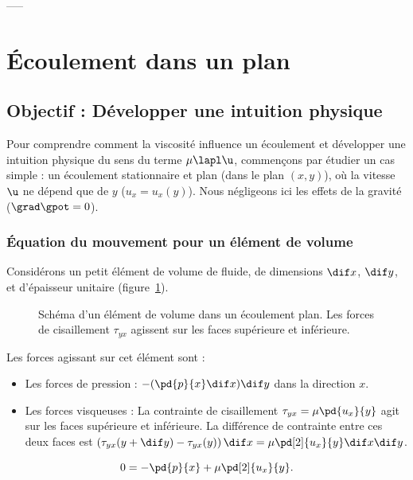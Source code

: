 -----

\section{Écoulement dans un plan}
\label{sec:ecoulement_plan}

\subsection{Objectif : Développer une intuition physique}
Pour comprendre comment la viscosité influence un écoulement et développer une intuition physique du sens du terme $\mu\lapl\u$, commençons par étudier un cas simple : un écoulement stationnaire et plan (dans le plan $(x,y)$), où la vitesse $\u$ ne dépend que de $y$ ($u_x = u_x(y)$). Nous négligeons ici les effets de la gravité ($\grad \gpot = 0$).

\subsubsection{Équation du mouvement pour un élément de volume}
Considérons un petit élément de volume de fluide, de dimensions $\dif x$, $\dif y$, et d'épaisseur unitaire (figure~\ref{fig:element_volume_plan}).

\begin{figure}[h]
\centering
\missingfigure{}
\caption{Schéma d'un élément de volume dans un écoulement plan. Les forces de cisaillement $\tau_{yx}$ agissent sur les faces supérieure et inférieure.}
\label{fig:element_volume_plan}
\end{figure}

Les forces agissant sur cet élément sont :
\begin{itemize}
    \item Les forces de pression : $-(\pd{p}{x}\dif x)\dif y$ dans la direction $x$.
    \item Les forces visqueuses : La contrainte de cisaillement $\tau_{yx} = \mu \pd{u_x}{y}$ agit sur les faces supérieure et inférieure. La différence de contrainte entre ces deux faces est $\left(\tau_{yx}(y+\dif y) - \tau_{yx}(y)\right)\dif x = \mu \pd[2]{u_x}{y} \dif x \dif y$.
\end{itemize}
\begin{displaymath}
0 = -\pd{p}{x} + \mu \pd[2]{u_x}{y}.
\end{displaymath}

